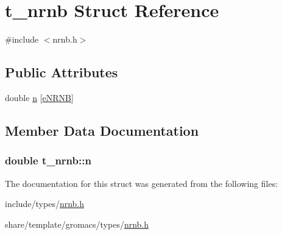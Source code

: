 \hypertarget{structt__nrnb}{\section{t\-\_\-nrnb \-Struct \-Reference}
\label{structt__nrnb}
}


{\ttfamily \#include $<$nrnb.\-h$>$}

\subsection*{\-Public \-Attributes}
\begin{DoxyCompactItemize}
\item 
double \hyperlink{structt__nrnb_a3dd29c134f9c4ee5f09a674b55266195}{n} \mbox{[}\hyperlink{share_2template_2gromacs_2types_2nrnb_8h_a35b7fa7665fe812ec8d7cf77bbcdbc26ae2a37ac8058faf9f1efa3d5eebbb3931}{e\-N\-R\-N\-B}\mbox{]}
\end{DoxyCompactItemize}


\subsection{\-Member \-Data \-Documentation}
\hypertarget{structt__nrnb_a3dd29c134f9c4ee5f09a674b55266195}{
\subsubsection[{n}]{\setlength{\rightskip}{0pt plus 5cm}double {\bf t\-\_\-nrnb\-::n}}}\label{structt__nrnb_a3dd29c134f9c4ee5f09a674b55266195}


\-The documentation for this struct was generated from the following files\-:\begin{DoxyCompactItemize}
\item 
include/types/\hyperlink{include_2types_2nrnb_8h}{nrnb.\-h}\item 
share/template/gromacs/types/\hyperlink{share_2template_2gromacs_2types_2nrnb_8h}{nrnb.\-h}\end{DoxyCompactItemize}

